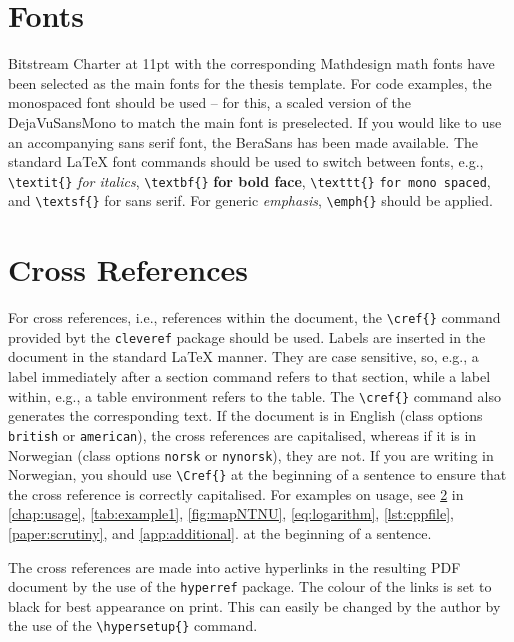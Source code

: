 \section{Fonts}

Bitstream Charter at 11pt with the corresponding Mathdesign math fonts have been selected as the main fonts for the thesis template. For code examples, the monospaced font should be used – for this, a scaled version of the DejaVuSansMono to match the main font is preselected. If you would like to use an accompanying sans serif font, the BeraSans has been made available. The standard \LaTeX{} font commands should be used to switch between fonts, e.g.,
\texttt{\textbackslash textit\{\}} \textit{for italics},
\texttt{\textbackslash textbf\{\}} \textbf{for bold face},
\texttt{\textbackslash texttt\{\}} \texttt{for mono spaced}, and
\texttt{\textbackslash textsf\{\}} \textsf{for sans serif}.
For generic \emph{emphasis}, \texttt{\textbackslash emph\{\}} should be applied.

\section{Cross References}
\label{sec:crossref}

For cross references, i.e., references within the document, the \texttt{\textbackslash cref\{\}} command provided byt the \texttt{cleveref} package should be used. Labels are inserted in the document in the standard \LaTeX{} manner. They are case sensitive, so, e.g., a label immediately after a section command refers to that section, while a label within, e.g., a table environment refers to the table. The \texttt{\textbackslash cref\{\}} command also generates the corresponding text. If the document is in English (class options \texttt{british} or \texttt{american}), the cross references are capitalised, whereas if it is in Norwegian (class options \texttt{norsk} or \texttt{nynorsk}), they are not. If you are writing in Norwegian, you should use \texttt{\textbackslash Cref\{\}} at the beginning of a sentence to ensure that the cross reference is correctly capitalised. For examples on usage, see \cref{sec:crossref} in \cref{chap:usage}, \cref{tab:example1}, \cref{fig:mapNTNU}, \cref{eq:logarithm}, \cref{lst:cppfile}, \cref{paper:scrutiny}, and \cref{app:additional}.  at the beginning of a sentence.

The cross references are made into active hyperlinks in the resulting PDF document by the use of the \texttt{hyperref} package. The colour of the links is set to black for best appearance on print. This can easily be changed by the author by the use of the \texttt{\textbackslash hypersetup\{\}} command.

